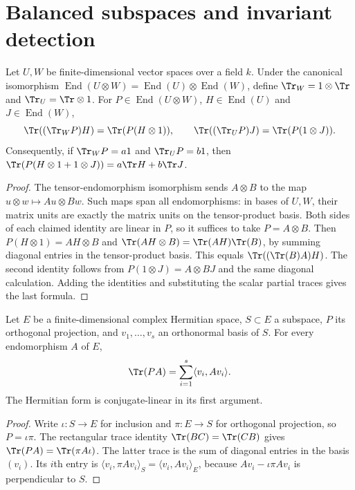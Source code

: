 \chapter{Balanced subspaces and invariant detection}

\begin{lemma}
\label{lem:balanced-partial-traces}
\leanok
Let $U,W$ be finite-dimensional vector spaces over a field $k$.
Under the canonical isomorphism
$\operatorname{End}(U\otimes W)=\operatorname{End}(U)\otimes
\operatorname{End}(W)$, define $\Tr_W=1\otimes\Tr$ and
$\Tr_U=\Tr\otimes1$. For $P\in\operatorname{End}(U\otimes W)$,
$H\in\operatorname{End}(U)$ and $J\in\operatorname{End}(W)$,
\[
 \Tr((\Tr_W P)H)=\Tr(P(H\otimes1)),\qquad
 \Tr((\Tr_U P)J)=\Tr(P(1\otimes J)).
\]
Consequently, if $\Tr_W P=a1$ and $\Tr_U P=b1$, then
$\Tr(P(H\otimes1+1\otimes J))=a\Tr H+b\Tr J$.
\end{lemma}
\begin{proof}
The tensor-endomorphism isomorphism sends $A\otimes B$ to the map
$u\otimes w\mapsto Au\otimes Bw$. Such maps span all endomorphisms:
in bases of $U,W$, their matrix units are exactly the matrix units on
the tensor-product basis. Both sides of each claimed identity are linear
in $P$, so it suffices to take $P=A\otimes B$. Then
$P(H\otimes1)=AH\otimes B$ and
$\Tr(AH\otimes B)=\Tr(AH)\Tr(B)$, by summing diagonal entries in
the tensor-product basis. This equals $\Tr((\Tr(B)A)H)$.
The second identity follows from
$P(1\otimes J)=A\otimes BJ$ and the same diagonal calculation.
Adding the identities and substituting the scalar partial traces gives
the last formula.
\end{proof}

\begin{lemma}
\label{lem:balanced-projection-trace}
\leanok
Let $E$ be a finite-dimensional complex Hermitian space, $S\subset E$
a subspace, $P$ its orthogonal projection, and $v_1,\ldots,v_s$ an
orthonormal basis of $S$. For every endomorphism $A$ of $E$,
\[
 \Tr(PA)=\sum_{i=1}^s\langle v_i,Av_i\rangle.
\]
The Hermitian form is conjugate-linear in its first argument.
\end{lemma}
\begin{proof}
Write $\iota:S\to E$ for inclusion and $\pi:E\to S$ for orthogonal
projection, so $P=\iota\pi$. The rectangular trace identity
$\Tr(BC)=\Tr(CB)$ gives $\Tr(PA)=\Tr(\pi A\iota)$.
The latter trace is the sum of diagonal entries in the basis $(v_i)$.
Its $i$th entry is $\langle v_i,\pi Av_i\rangle_S
=\langle v_i,Av_i\rangle_E$, because $Av_i-\iota\pi Av_i$
is perpendicular to $S$.
\end{proof}


